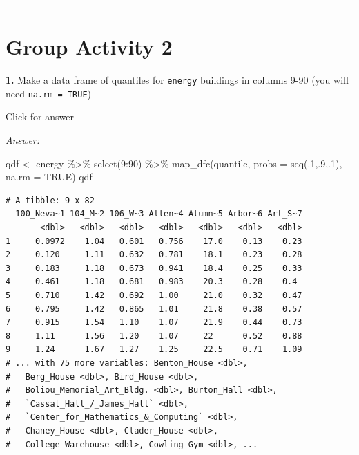 \documentclass[
]{book}
\newenvironment{Shaded}{\begin{snugshade}}{\end{snugshade}}
\newcommand{\AttributeTok}[1]{\textcolor[rgb]{0.77,0.63,0.00}{#1}}
\newcommand{\ConstantTok}[1]{\textcolor[rgb]{0.00,0.00,0.00}{#1}}
\newcommand{\DecValTok}[1]{\textcolor[rgb]{0.00,0.00,0.81}{#1}}
\newcommand{\FunctionTok}[1]{\textcolor[rgb]{0.00,0.00,0.00}{#1}}
\newcommand{\NormalTok}[1]{#1}
\newcommand{\OtherTok}[1]{\textcolor[rgb]{0.56,0.35,0.01}{#1}}
\newcommand{\SpecialCharTok}[1]{\textcolor[rgb]{0.00,0.00,0.00}{#1}}
\begin{document}
\begin{center}\rule{0.5\linewidth}{0.5pt}\end{center}

\hypertarget{group-activity-2-2}{%
\section{Group Activity 2}\label{group-activity-2-2}}

\textbf{1.} Make a data frame of quantiles for \texttt{energy} buildings in columns 9-90 (you will need \texttt{na.rm\ =\ TRUE})

Click for answer

\emph{Answer:}

\begin{Shaded}
\begin{Highlighting}[]
\NormalTok{qdf }\OtherTok{\textless{}{-}}\NormalTok{ energy }\SpecialCharTok{\%\textgreater{}\%} \FunctionTok{select}\NormalTok{(}\DecValTok{9}\SpecialCharTok{:}\DecValTok{90}\NormalTok{) }\SpecialCharTok{\%\textgreater{}\%}
  \FunctionTok{map\_dfc}\NormalTok{(quantile, }\AttributeTok{probs =} \FunctionTok{seq}\NormalTok{(.}\DecValTok{1}\NormalTok{,.}\DecValTok{9}\NormalTok{,.}\DecValTok{1}\NormalTok{), }\AttributeTok{na.rm =} \ConstantTok{TRUE}\NormalTok{)}
\NormalTok{qdf}
\end{Highlighting}
\end{Shaded}

\begin{verbatim}
# A tibble: 9 x 82
  100_Neva~1 104_M~2 106_W~3 Allen~4 Alumn~5 Arbor~6 Art_S~7
       <dbl>   <dbl>   <dbl>   <dbl>   <dbl>   <dbl>   <dbl>
1     0.0972    1.04   0.601   0.756    17.0    0.13    0.23
2     0.120     1.11   0.632   0.781    18.1    0.23    0.28
3     0.183     1.18   0.673   0.941    18.4    0.25    0.33
4     0.461     1.18   0.681   0.983    20.3    0.28    0.4 
5     0.710     1.42   0.692   1.00     21.0    0.32    0.47
6     0.795     1.42   0.865   1.01     21.8    0.38    0.57
7     0.915     1.54   1.10    1.07     21.9    0.44    0.73
8     1.11      1.56   1.20    1.07     22      0.52    0.88
9     1.24      1.67   1.27    1.25     22.5    0.71    1.09
# ... with 75 more variables: Benton_House <dbl>,
#   Berg_House <dbl>, Bird_House <dbl>,
#   Boliou_Memorial_Art_Bldg. <dbl>, Burton_Hall <dbl>,
#   `Cassat_Hall_/_James_Hall` <dbl>,
#   `Center_for_Mathematics_&_Computing` <dbl>,
#   Chaney_House <dbl>, Clader_House <dbl>,
#   College_Warehouse <dbl>, Cowling_Gym <dbl>, ...
\end{verbatim}
\end{document}
